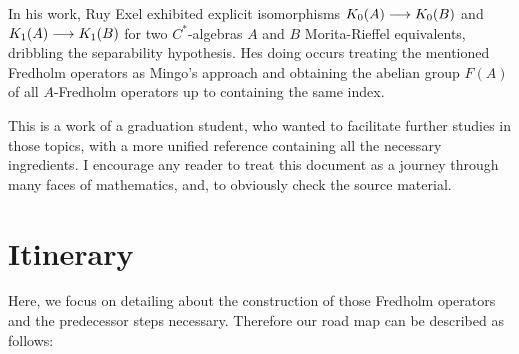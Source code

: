 In his work, Ruy Exel exhibited explicit isomorphisms $K_0(A)\longrightarrow K_0(B)$ and $K_1(A)\longrightarrow K_1(B)$ for two $C^*$-algebras $A$ and $B$ Morita-Rieffel equivalents, dribbling the separability hypothesis. Hes doing occurs treating the mentioned Fredholm operators as Mingo's approach \cite{mingo1987K} and obtaining the abelian group $F(A)$ of all $A$-Fredholm operators up to containing the same index. 

This is a work of a graduation student, who wanted to facilitate further studies in those topics, with a more unified reference containing all the necessary ingredients. I encourage any reader to treat this document as a journey through many faces of mathematics, and, to obviously check the source material. 

\section*{Itinerary}
Here, we focus on detailing about the construction of those Fredholm operators and the predecessor steps necessary. Therefore our road map can be described as follows:
